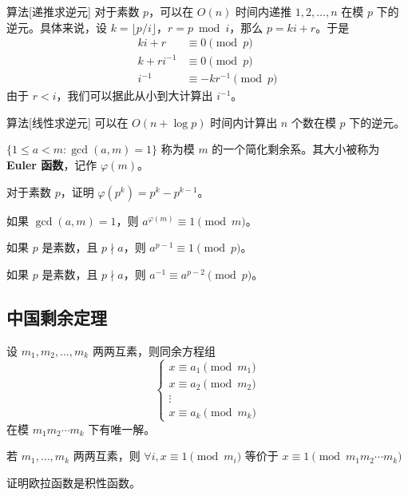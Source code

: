 \begin{descbox}{算法}[递推求逆元]
    对于素数 $p$，可以在 $O(n)$ 时间内递推 $1,2,\ldots,n$ 在模 $p$ 下的逆元。具体来说，设 $k=\lfloor p/i\rfloor$，$r=p\bmod i$，那么 $p=ki+r$。于是
    $$
    \begin{aligned}
    ki+r&\equiv 0\pmod p\\
    k+ri^{-1}&\equiv 0\pmod p\\
    i^{-1}&\equiv -kr^{-1}\pmod p
    \end{aligned}
    $$
    由于 $r<i$，我们可以据此从小到大计算出 $i^{-1}$。
\end{descbox}
\begin{descbox}{算法}[线性求逆元]
    可以在 $O(n+\log p)$ 时间内计算出 $n$ 个数在模 $p$ 下的逆元。
\end{descbox}

\begin{definition}
    $\{1\le a<m:\gcd(a,m)=1\}$ 称为模 $m$ 的一个简化剩余系。其大小被称为\textbf{Euler 函数}，记作 $\varphi(m)$。
\end{definition}
\begin{exercise}
    对于素数 $p$，证明 $\varphi(p^k)=p^k-p^{k-1}$。
\end{exercise}

\begin{theorem}[Euler 定理]
    如果 $\gcd(a,m)=1$，则 $a^{\varphi(m)}\equiv 1\pmod m$。
\end{theorem}
\begin{corollary}
    如果 $p$ 是素数，且 $p\nmid a$，则 $a^{p-1}\equiv 1\pmod p$。
\end{corollary}
\begin{corollary}
    如果 $p$ 是素数，且 $p\nmid a$，则 $a^{-1}\equiv a^{p-2}\pmod p$。
\end{corollary}


\subsection{中国剩余定理}

\begin{theorem}[中国剩余定理]
    设 $m_1,m_2,\ldots,m_k$ 两两互素，则同余方程组
    $$
    \begin{cases}
        x\equiv a_1\pmod{m_1} \\
        x\equiv a_2\pmod{m_2} \\
        \vdots \\
        x\equiv a_k\pmod{m_k}
    \end{cases}
    $$
    在模 $m_1m_2\cdots m_k$ 下有唯一解。
\end{theorem}
\begin{corollary}
    若 $m_1,\ldots,m_k$ 两两互素，则 $\forall i,x\equiv 1\pmod m_i$ 等价于 $x\equiv 1\pmod{m_1m_2\cdots m_k}$
\end{corollary}
\begin{exercise}
    证明欧拉函数是积性函数。
\end{exercise}

